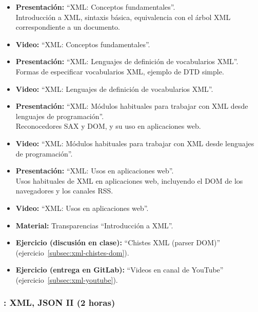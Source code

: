 \documentclass[a4paper,12pt]{article}
\begin{document}
\begin{itemize}
\item \textbf{Presentación:} ``XML: Conceptos fundamentales''. \\
  Introducción a XML, sintaxis básica, equivalencia con el árbol XML correspondiente a un documento.
\item \textbf{Video:} ``XML: Conceptos fundamentales''.

\item \textbf{Presentación:} ``XML: Lenguajes de definición de vocabularios XML''. \\
  Formas de especificar vocabularios XML, ejemplo de DTD simple.
\item \textbf{Video:} ``XML: Lenguajes de definición de vocabularios XML''.
\item \textbf{Presentación:} ``XML: Módulos habituales para trabajar con XML desde lenguajes de programación''. \\
  Reconocedores SAX y DOM, y su uso en aplicaciones web.
\item \textbf{Video:} ``XML: Módulos habituales para trabajar con XML desde lenguajes de programación''.
\item \textbf{Presentación:} ``XML: Usos en aplicaciones web''. \\
  Usos habituales de XML en aplicaciones web, incluyendo el DOM de los navegadores y los canales RSS.
\item \textbf{Video:} ``XML: Usos en aplicaciones web''.
\item \textbf{Material:} Transparencias ``Introducción a XML''.
\item \textbf{Ejercicio (discusión en clase):} ``Chistes XML (parser DOM)'' (ejercicio~\ref{subsec:xml-chistes-dom}).
\item \textbf{Ejercicio (entrega en GitLab):} ``Videos en canal de YouTube'' (ejercicio~\ref{subsec:xml-youtube}).
\end{itemize}

\subsubsection{\martesJ: XML, JSON II (2 horas)}
\label{cal:martesJ}
\end{document}
